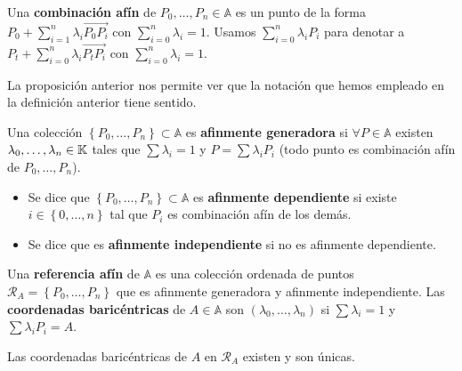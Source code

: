 \begin{definition}
Una \textbf{combinación afín} de $\displaystyle P_{0}, \ldots, P_{n} \in \mathbb{A} $ es un punto de la forma $\displaystyle P_{0} + \sum^{n}_{i = 1}\lambda_{i}\overrightarrow{P_{0}P_{i}} $ con $\displaystyle \sum^{n}_{i = 0}\lambda_{i} = 1 $. Usamos $\displaystyle \sum^{n}_{i = 0}\lambda_{i}P_{i} $ para denotar a $\displaystyle P_{t}+\sum^{n}_{i = 0}\lambda_{i}\overrightarrow{P_{t}P_{i}} $ con $\displaystyle \sum^{n}_{i = 0}\lambda_{i} = 1 $.
\end{definition}
\begin{observation}
La proposición anterior nos permite ver que la notación que hemos empleado en la definición anterior tiene sentido. 
\end{observation}
\begin{definition}
	Una colección $\displaystyle \left\{ P_{0}, \ldots, P_{n}\right\} \subset \mathbb{A} $ es \textbf{afinmente generadora} si $\displaystyle \forall P \in \mathbb{A} $ existen $\displaystyle \lambda_{0}, \ldots, \lambda_{n} \in \mathbb{K} $ tales que $\displaystyle \sum\lambda_{i} = 1 $ y $\displaystyle P = \sum\lambda_{i}P_{i} $ (todo punto es combinación afín de $\displaystyle P_{0}, \ldots, P_{n} $). 
	\begin{itemize}
	\item Se dice que $\displaystyle \left\{ P_{0}, \ldots, P_{n}\right\} \subset \mathbb{A} $ es \textbf{afinmente dependiente} si existe $\displaystyle i \in \left\{ 0, \ldots, n\right\}  $ tal que $\displaystyle P_{i} $ es combinación afín de los demás. 
	\item Se dice que es \textbf{afinmente independiente} si no es afinmente dependiente.
	\end{itemize}
\end{definition}
\begin{definition}
	Una \textbf{referencia afín} de $\displaystyle \mathbb{A} $ es una colección ordenada de puntos $\displaystyle \mathcal{R}_{A} = \left\{ P_{0}, \ldots, P_{n}\right\}  $ que es afinmente generadora y afinmente independiente. Las \textbf{coordenadas baricéntricas} de $\displaystyle A \in \mathbb{A} $ son $\displaystyle \left(\lambda_{0}, \ldots, \lambda_{n}\right) $ si $\displaystyle \sum\lambda_{i} = 1 $ y $\displaystyle \sum\lambda_{i}P_{i} = A $.
\end{definition}
\begin{prop}
Las coordenadas baricéntricas de $\displaystyle A $ en $\displaystyle \mathcal{R}_{A} $ existen y son únicas. 
\end{prop}

